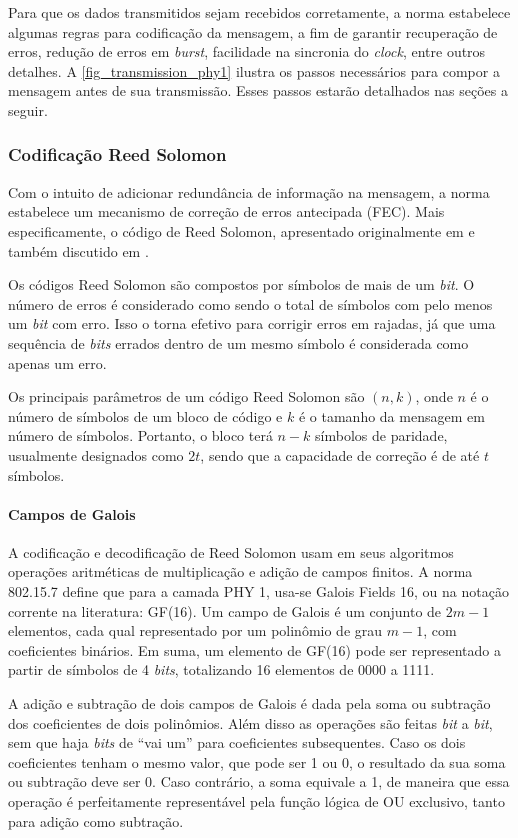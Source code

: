 	Para que os dados transmitidos sejam recebidos corretamente, a norma estabelece algumas regras para codificação da mensagem, a fim de garantir recuperação de erros, redução de erros em \emph{burst}, facilidade na sincronia do \textit{clock}, entre outros detalhes. A \autoref{fig_transmission_phy1} ilustra os passos necessários para compor a mensagem antes de sua transmissão. Esses passos estarão detalhados nas seções a seguir.


	\subsubsection{Codificação Reed Solomon}

	Com o intuito de adicionar redundância de informação na mensagem, a norma estabelece um mecanismo de correção de erros antecipada (FEC). Mais especificamente, o código de Reed Solomon, apresentado originalmente em \cite{reed-solomon-original} e também discutido em \cite{rs-bbc}.

	Os códigos Reed Solomon são compostos por símbolos de mais de um \textit{bit}. O número de erros é considerado como sendo o total de símbolos com pelo menos um \textit{bit} com erro. Isso o torna efetivo para corrigir erros em rajadas, já que uma sequência de \textit{bits} errados dentro de um mesmo símbolo é considerada como apenas um erro.

	Os principais parâmetros de um código Reed Solomon são $(n, k)$, onde $n$ é o número de símbolos de um bloco de código e $k$ é o tamanho da mensagem em número de símbolos. Portanto, o bloco terá $n - k$ símbolos de paridade, usualmente designados como $2t$, sendo que a capacidade de correção é de até $t$ símbolos.

	\paragraph*{Campos de Galois}

	A codificação e decodificação de Reed Solomon usam em seus algoritmos operações aritméticas de multiplicação e adição de campos finitos. A norma 802.15.7 define que para a camada PHY 1, usa-se Galois Fields 16, ou na notação corrente na literatura: GF(16). Um campo de Galois é um conjunto de $2m - 1$ elementos, cada qual representado por um polinômio de grau $m - 1$, com coeficientes binários. Em suma, um elemento de GF(16) pode ser representado a partir de símbolos de 4 \textit{bits}, totalizando 16 elementos de 0000 a 1111.

	A adição e subtração de dois campos de Galois é dada pela soma ou subtração dos coeficientes de dois polinômios. Além disso as operações são feitas \textit{bit} a \textit{bit}, sem que haja \textit{bits} de ``vai um'' para coeficientes subsequentes. Caso os dois coeficientes tenham o mesmo valor, que pode ser 1 ou 0, o resultado da sua soma ou subtração deve ser 0. Caso contrário, a soma equivale a 1, de maneira que essa operação é perfeitamente representável pela função lógica de OU exclusivo, tanto para adição como subtração.

